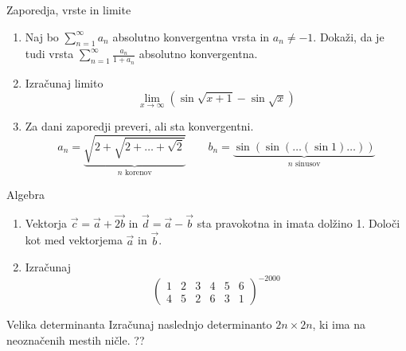 \begin{frame}{Zaporedja, vrste in limite}
	\begin{enumerate}
		\item 
		Naj bo \(\sum_{n=1}^{\infty}a_n\) absolutno konvergentna vrsta in $a_n \ne -1$.
		Dokaži, da je tudi vrsta $\sum_{n=1}^\infty \frac{a_n}{1+a_n}$
		absolutno konvergentna.

		\item
		Izračunaj limito
		\[
		\lim_{x\to\infty}{(\sin\sqrt{x+1}-\sin\sqrt{x})}
		\]

		\item
		Za dani zaporedji preveri, ali sta konvergentni.
	\[
	a_n=\underbrace{\sqrt{2+\sqrt{2 + \ldots+\sqrt{2}}}}_{n \text{ korenov}} %
	\qquad
	b_n = \underbrace{\sin(\sin(\dots(\sin 1)\dots))}_{n \text{ sinusov}}
	\]%


	\end{enumerate}
\end{frame}

\begin{frame}{Algebra}
	\begin{enumerate}
		\item
		Vektorja 
		\(
		\vec{c} = \vec{a} + \vec{2b}
		\)
		in
		\(
		\vec{d} = \vec{a} - \vec{b}
 		\)
		sta pravokotna in imata dolžino 1. Določi kot med vektorjema $\vec{a}$ in $\vec{b}$.
		\item 
		Izračunaj
		\[
		\begin{pmatrix}
			1&2&3&4&5&6\\
			4&5&2&6&3&1
		\end{pmatrix}^{-2000}
		\]
	\end{enumerate}
\end{frame}

\begin{frame}{Velika determinanta}
	Izračunaj naslednjo determinanto $2n \times 2n$, ki ima na neoznačenih mestih ničle.
	??
\end{frame}

